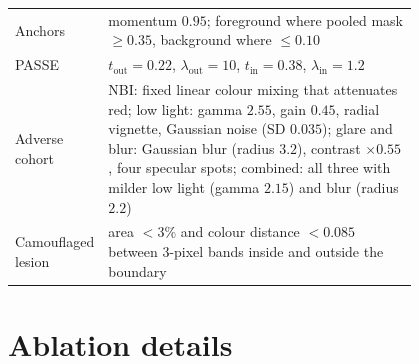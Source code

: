 \documentclass[10pt,twocolumn]{article}
\begin{document}
\begin{table}[h]
\begin{tabular}{@{}l p{0.8\linewidth}@{}}
    Anchors & momentum $0.95$; foreground where pooled mask $\ge0.35$, background where $\le0.10$ \\
    PASSE & $t_{\text{out}}=0.22$, $\lambda_{\text{out}}=10$, $t_{\text{in}}=0.38$, $\lambda_{\text{in}}=1.2$ \\
    \midrule
    Adverse cohort & NBI: fixed linear colour mixing that attenuates red; low light: gamma $2.55$, gain $0.45$, radial vignette, Gaussian noise (SD $0.035$); glare and blur: Gaussian blur (radius $3.2$), contrast $\times0.55$, four specular spots; combined: all three with milder low light (gamma $2.15$) and blur (radius $2.2$) \\
    Camouflaged lesion & area $<3\%$ and colour distance $<0.085$ between $3$-pixel bands inside and outside the boundary \\
    \bottomrule
  \end{tabular}
\end{table}

\section{Ablation details}
\label{app:ablation}
\end{document}
